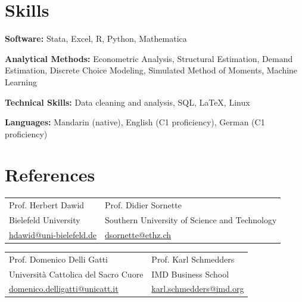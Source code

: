 \documentclass[a4paper,11pt]{article}
\begin{document}
\section{Skills}

\textbf{Software:} Stata, Excel, R, Python, Mathematica  

\textbf{Analytical Methods:} Econometric Analysis, Structural Estimation, Demand Estimation, Discrete Choice Modeling, Simulated Method of Moments, Machine Learning  

\textbf{Technical Skills:} Data cleaning and analysis, SQL, \LaTeX, Linux  

\textbf{Languages:} Mandarin (native), English (C1 proficiency), German (C1 proficiency)

\section{References}

\begin{tabularx}{\linewidth}{X X}
Prof. Herbert Dawid & Prof. Didier Sornette \\
Bielefeld University & Southern University of Science and Technology \\
\href{mailto:hdawid@uni-bielefeld.de}{hdawid@uni-bielefeld.de} &
\href{mailto:dsornette@ethz.ch}{dsornette@ethz.ch}
\end{tabularx}

\vspace{6pt}

\begin{tabularx}{\linewidth}{X X}
Prof. Domenico Delli Gatti & Prof. Karl Schmedders \\
Università Cattolica del Sacro Cuore & IMD Business School \\
\href{mailto:domenico.delligatti@unicatt.it}{domenico.delligatti@unicatt.it} &
\href{mailto:karl.schmedders@imd.org}{karl.schmedders@imd.org}
\end{tabularx}
\end{document}

